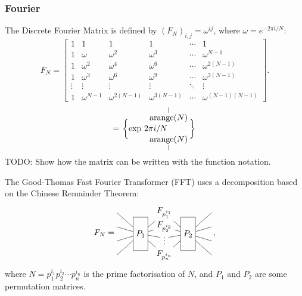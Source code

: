 \subsubsection{Fourier}

The Discrete Fourier Matrix is defined by $(F_N)_{i,j}=\omega^{ij}$,
where $\omega = e^{-2\pi i/N}$:
\[
   \renewcommand*{\arraystretch}{1}
F_N =
   \begin{bmatrix}
      1&1&1&1&\cdots &1 \\
      1&\omega&\omega^2&\omega^3&\cdots&\omega^{N-1} \\
      1&\omega^2&\omega^4&\omega^6&\cdots&\omega^{2(N-1)}\\ 1&\omega^3&\omega^6&\omega^9&\cdots&\omega^{3(N-1)}\\
      \vdots&\vdots&\vdots&\vdots&\ddots&\vdots\\
      1&\omega^{N-1}&\omega^{2(N-1)}&\omega^{3(N-1)}&\cdots&\omega^{(N-1)(N-1)}
   \end{bmatrix}
.
\]
\[
   =
   \begin{tikzpicture}[baseline=-.25em, y=1.3em, inner sep=1pt]
      \node at (0,0) {$\bigg\{\mathrm{exp} \,\, 2\pi i/N$};
      \node (a) at (1,1) {$\mathrm{arange}(N)$};
      \node (b) at (1,-1) {$\mathrm{arange}(N)$};
      \node at (2,0) {$\bigg\}$};
      \draw (a.north) -- ++(0, .5);
      \draw (b.south) -- ++(0, -.5);
   \end{tikzpicture}
\]
TODO: Show how the matrix can be written with the function notation.

The Good-Thomas Fast Fourier Transformer (FFT) uses a decomposition based on the Chinese Remainder Theorem:
\[
F_{N} = 
   \begin{tikzpicture}[baseline=-1em, y=1.7em]
      \node[rectangle, draw, minimum height=4em] (P1) at (0,-.5) {$P_1$};
      \node (A) at (1,1) {$F_{p_1^{i_1}}$};
      \node[rectangle, draw, minimum height=4em] (P2) at (2,-.5) {$P_2$};
      \node (B) at (1,0) {$F_{p_2^{i_2}}$};
      \node (C) at (1,-.8) {$\vdots$};
      \node (D) at (1,-2) {$F_{p_n^{i_n}}$};
      \draw (-1,1) -- (P1) -- (A) -- (P2) -- (3, 1);
      \draw (-1,0) -- (P1) -- (B) -- (P2) -- (3, 0);
      \draw (-1,-1) -- (P1) -- (C) -- (P2) -- (3, -1);
      \draw (-1,-2) -- (P1) -- (D) -- (P2) -- (3, -2);
   \end{tikzpicture}
   \,,
\]
where $N = p_1^{i_1} p_2^{i_2} \cdots p_n^{i_n}$ is the prime factorisation of $N$, and $P_1$ and $P_2$ are some permutation matrices.

